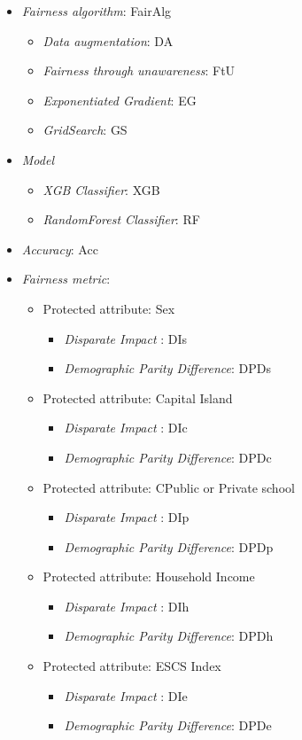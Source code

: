 \begin{itemize}
    \item \emph{Fairness algorithm}: FairAlg
    \begin{itemize}
        \item \emph{Data augmentation}: DA
        \item \emph{Fairness through unawareness}: FtU
        \item \emph{Exponentiated Gradient}: EG
        \item \emph{GridSearch}: GS
    \end{itemize}
    \item \emph{Model}
    \begin{itemize}
        \item \emph{XGB Classifier}: XGB
        \item \emph{RandomForest Classifier}: RF
    \end{itemize}
    \item \emph{Accuracy}: Acc
    \item \emph{Fairness metric}:
    \begin{itemize}
        \item Protected attribute: Sex
        \begin{itemize}
            \item \emph{Disparate Impact }: DIs
            \item \emph{Demographic Parity Difference}: DPDs
        \end{itemize}
        \item Protected attribute: Capital Island
        \begin{itemize}
            \item \emph{Disparate Impact }: DIc
            \item \emph{Demographic Parity Difference}: DPDc
        \end{itemize}
        \item Protected attribute: CPublic or Private school
        \begin{itemize}
            \item \emph{Disparate Impact }: DIp
            \item \emph{Demographic Parity Difference}: DPDp
        \end{itemize}
        \item Protected attribute: Household Income
        \begin{itemize}
            \item \emph{Disparate Impact }: DIh
            \item \emph{Demographic Parity Difference}: DPDh
        \end{itemize}
        \item Protected attribute: ESCS Index
        \begin{itemize}
            \item \emph{Disparate Impact }: DIe
            \item \emph{Demographic Parity Difference}: DPDe
        \end{itemize}
    \end{itemize}
\end{itemize}

